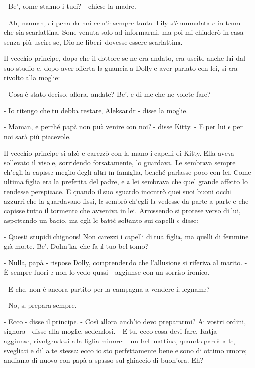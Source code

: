 - Be', come stanno i tuoi? - chiese la madre. 

- Ah, maman, di pena da noi ce n'è sempre tanta. Lily s'è ammalata e io temo che sia scarlattina. Sono venuta solo ad informarmi, ma poi mi chiuderò in casa senza più uscire se, Dio ne liberi, dovesse essere scarlattina. 

Il vecchio principe, dopo che il dottore se ne era andato, era uscito anche lui dal suo studio e, dopo aver offerta la guancia a Dolly e aver parlato con lei, si era rivolto alla moglie: 

- Cosa è stato deciso, allora, andate? Be', e di me che ne volete fare? 

- Io ritengo che tu debba restare, Aleksandr - disse la moglie. 

- Maman, e perché papà non può venire con noi? - disse Kitty. - E per lui e per noi sarà più piacevole. 

Il vecchio principe si alzò e carezzò con la mano i capelli di Kitty. Ella aveva sollevato il viso e, sorridendo forzatamente, lo guardava. Le sembrava sempre ch'egli la capisse meglio degli altri in famiglia, benché parlasse poco con lei. Come ultima figlia era la preferita del padre, e a lei sembrava che quel grande affetto lo rendesse perspicace. E quando il suo sguardo incontrò quei suoi buoni occhi azzurri che la guardavano fissi, le sembrò ch'egli la vedesse da parte a parte e che capisse tutto il tormento che avveniva in lei. Arrossendo si protese verso di lui, aspettando un bacio, ma egli le batté soltanto sui capelli e disse: 

- Questi stupidi chignons! Non carezzi i capelli di tua figlia, ma quelli di femmine già morte. Be', Dolin'ka, che fa il tuo bel tomo? 

- Nulla, papà - rispose Dolly, comprendendo che l'allusione si riferiva al marito. - È sempre fuori e non lo vedo quasi - aggiunse con un sorriso ironico. 

- E che, non è ancora partito per la campagna a vendere il legname? 

- No, si prepara sempre. 

- Ecco - disse il principe. - Così allora anch'io devo prepararmi? Ai vostri ordini, signora - disse alla moglie, sedendosi. - E tu, ecco cosa devi fare, Katja - aggiunse, rivolgendosi alla figlia minore: - un bel mattino, quando parrà a te, svegliati e di' a te stessa: ecco io sto perfettamente bene e sono di ottimo umore; andiamo di nuovo con papà a spasso sul ghiaccio di buon'ora. Eh? 

